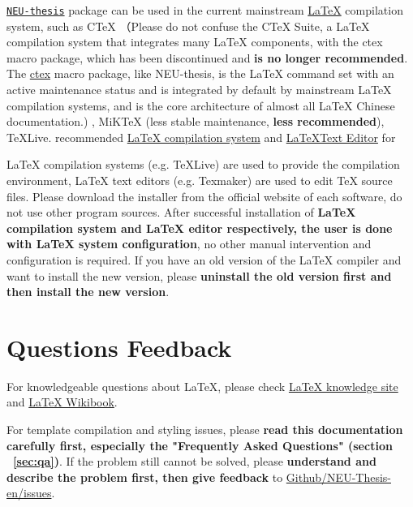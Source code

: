 \href{https://github.com/sci-m-wang/NEU-Thesis-en}{\texttt{NEU-thesis}} package can be used in the current mainstream  \href{https://en.wikibooks.org/wiki/LaTeX/Introduction}{\LaTeX{}} compilation system, such as C\TeX{} （Please do not confuse the C\TeX{} Suite, a \LaTeX{} compilation system that integrates many \LaTeX{} components, with the ctex macro package, which has been discontinued and \textbf{is no longer recommended}. The \href{https://ctan.org/pkg/ctex?lang=en}{ctex} macro package, like NEU-thesis, is the \LaTeX{} command set with an active maintenance status and is integrated by default by mainstream \LaTeX{} compilation systems, and is the core architecture of almost all \LaTeX{} Chinese documentation.) , MiK\TeX{} (less stable maintenance, \textbf{less recommended}), \TeX{}Live. recommended \href{https://en.wikibooks.org/wiki/LaTeX/Installation}{\LaTeX{} compilation system} and \href{https ://en.wikibooks.org/wiki/LaTeX/Installation}{\LaTeX{}Text Editor} for

\LaTeX{} compilation systems (e.g. \TeX{}Live) are used to provide the compilation environment, \LaTeX{} text editors (e.g. Texmaker) are used to edit \TeX{} source files. Please download the installer from the official website of each software, do not use other program sources. After successful installation of \textbf{\LaTeX{} compilation system and \LaTeX{} editor respectively, the user is done with \LaTeX{} system configuration}, no other manual intervention and configuration is required. If you have an old version of the \LaTeX{} compiler and want to install the new version, please \textbf{uninstall the old version first and then install the new version}.

\section{Questions Feedback}

For knowledgeable questions about \LaTeX{}, please check 
\href{https://github.com/mohuangrui/ucasthesis/wiki}{\LaTeX{} knowledge site} and 
\href{https://en.wikibooks.org/wiki/LaTeX}{\LaTeX{} Wikibook}.

For template compilation and styling issues, please \textbf{read this documentation carefully first, especially the "Frequently Asked Questions" (section ~\ref{sec:qa})}. If the problem still cannot be solved, please \textbf{understand and describe the problem first, then give feedback} to \href{https://github.com/sci-m-wang/NEU-Thesis-en/issues}{Github/NEU-Thesis-en/issues}.

